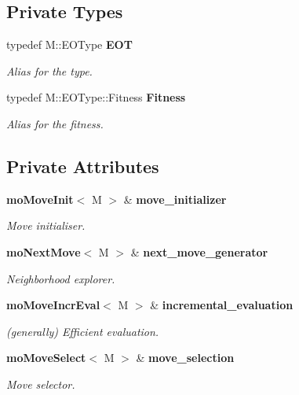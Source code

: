 \subsection*{Private Types}
\begin{CompactItemize}
\item 
typedef M::EOType {\bf EOT}\label{classmo_h_c_move_loop_expl_y0}

\begin{CompactList}\small\item\em Alias for the type. \item\end{CompactList}\item 
typedef M::EOType::Fitness {\bf Fitness}\label{classmo_h_c_move_loop_expl_y1}

\begin{CompactList}\small\item\em Alias for the fitness. \item\end{CompactList}\end{CompactItemize}
\subsection*{Private Attributes}
\begin{CompactItemize}
\item 
{\bf mo\-Move\-Init}$<$ M $>$ \& {\bf move\_\-initializer}\label{classmo_h_c_move_loop_expl_r0}

\begin{CompactList}\small\item\em Move initialiser. \item\end{CompactList}\item 
{\bf mo\-Next\-Move}$<$ M $>$ \& {\bf next\_\-move\_\-generator}\label{classmo_h_c_move_loop_expl_r1}

\begin{CompactList}\small\item\em Neighborhood explorer. \item\end{CompactList}\item 
{\bf mo\-Move\-Incr\-Eval}$<$ M $>$ \& {\bf incremental\_\-evaluation}\label{classmo_h_c_move_loop_expl_r2}

\begin{CompactList}\small\item\em (generally) Efficient evaluation. \item\end{CompactList}\item 
{\bf mo\-Move\-Select}$<$ M $>$ \& {\bf move\_\-selection}\label{classmo_h_c_move_loop_expl_r3}

\begin{CompactList}\small\item\em Move selector. \item\end{CompactList}\end{CompactItemize}


